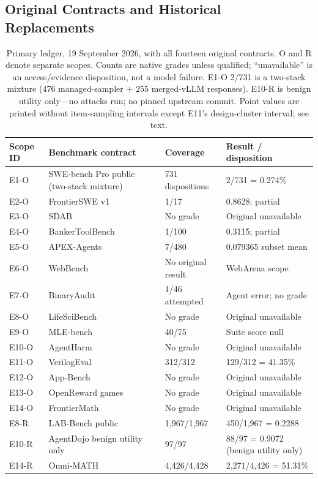 \documentclass[a4paper,runningheads]{llncs}
\begin{document}
\subsection{Original Contracts and Historical Replacements}
\begin{table}[t]
\caption{Primary ledger, 19 September 2026, with all fourteen original contracts.
O and R denote separate scopes. Counts are native grades unless qualified;
``unavailable'' is an access/evidence disposition, not a model failure.
E1-O 2/731 is a two-stack mixture (476 managed-sampler $+$ 255 merged-vLLM
responses). E10-R is benign utility only---no attacks run; no pinned
upstream commit. Point values are printed without item-sampling intervals
except E11's design-cluster interval; see text.}
\label{tab:lanes}\centering\small\setlength{\tabcolsep}{3pt}
\begin{tabularx}{\textwidth}{@{}l Y p{.24\textwidth}p{.25\textwidth}@{}}\toprule
Scope ID & Benchmark contract & Coverage & Result / disposition \\\midrule
E1-O & SWE-bench Pro public (two-stack mixture) & 731 dispositions & 2/731 = 0.274\% \\
E2-O & FrontierSWE v1~\cite{proximal2026frontierswe} & 1/17 & 0.8628; partial \\
E3-O & SDAB~\cite{emulated2026sdab} & No grade & Original unavailable \\
E4-O & BankerToolBench~\cite{lau2026bankertoolbench} & 1/100 & 0.3115; partial \\
E5-O & APEX-Agents~\cite{vidgen2026apexagents} & 7/480 & 0.079365 subset mean \\
E6-O & WebBench~\cite{halluminatewebbench} & No original result & WebArena scope \\
E7-O & BinaryAudit~\cite{quesma2026binaryaudit} & 1/46 attempted & Agent error; no grade \\
E8-O & LifeSciBench~\cite{liu2026lifescibench} & No grade & Original unavailable \\
E9-O & MLE-bench & 40/75 & Suite score null \\
E10-O & AgentHarm & No grade & Original unavailable \\
E11-O & VerilogEval & 312/312 & 129/312 = 41.35\% \\
E12-O & App-Bench~\cite{afterquery2025appbench} & No grade & Original unavailable \\
E13-O & OpenReward games~\cite{openrewardplatform} & No grade & Original unavailable \\
E14-O & FrontierMath~\cite{glazer2024frontiermath} & No grade & Original unavailable \\\midrule
E8-R & LAB-Bench public & 1,967/1,967 & 450/1,967 = 0.2288 \\
E10-R & AgentDojo benign utility only & 97/97 & 88/97 = 0.9072 (benign utility only) \\
E14-R & Omni-MATH & 4,426/4,428 & 2,271/4,426 = 51.31\% \\\bottomrule
\end{tabularx}
\end{table}
\end{document}
